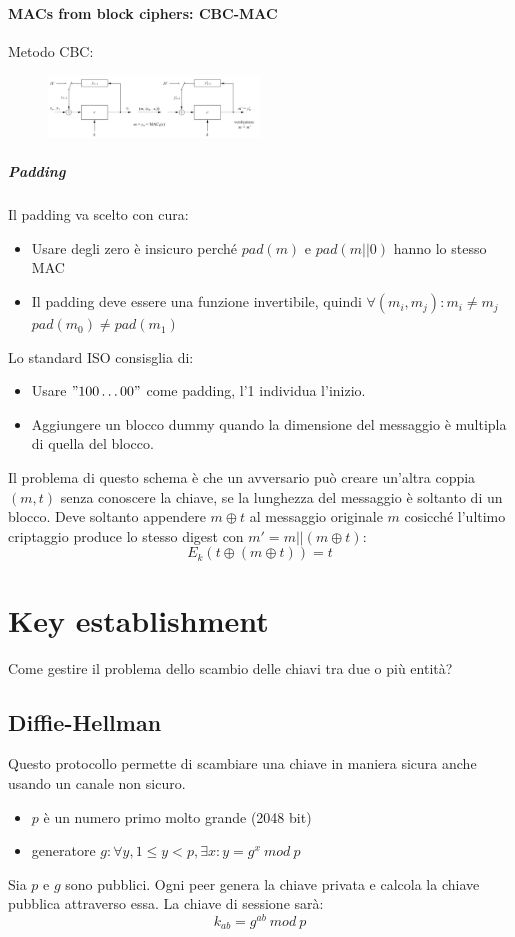 \documentclass[a4paper,12pt]{article}
\begin{document}
\paragraph{MACs from block ciphers: CBC-MAC}
Metodo CBC:
\begin{figure}[H]
  \centering
  \includegraphics[width=0.5\textwidth]{img/cbc-mac}
\end{figure}
\subparagraph{Padding} Il padding va scelto con cura:
\begin{itemize}
	\item Usare degli zero è insicuro perché $pad(m)$ e $pad(m||0)$ hanno lo stesso MAC 
	\item Il padding deve essere una funzione invertibile, quindi $\forall(m_i,m_j) : m_i \neq m_j$ \\ $pad(m_0) \neq pad(m_1)$
\end{itemize}
Lo standard ISO consisglia di:
\begin{itemize}
	\item Usare $"100\ldots00"$ come padding, l'1 individua l'inizio.
	\item Aggiungere un blocco dummy quando la dimensione del messaggio è multipla di quella del blocco.
\end{itemize}
Il problema di questo schema è che un avversario può creare un'altra coppia $(m,t)$ senza conoscere la chiave, se la lunghezza del messaggio è soltanto di un blocco.
Deve soltanto appendere $m \oplus t$ al messaggio originale $m$ cosicché l'ultimo criptaggio produce lo stesso digest con $m' = m||(m \oplus t)$:
$$ E_k(t \oplus (m \oplus t)) = t $$

\newpage

\section{Key establishment}
Come gestire il problema dello scambio delle chiavi tra due o più entità?
\subsection{Diffie-Hellman}
Questo protocollo permette di scambiare una chiave in maniera sicura anche usando un canale non sicuro.
\begin{itemize}
	\item $p$ è un numero primo molto grande (2048 bit)
	\item generatore $g : \forall y, 1 \leq y < p, \exists x : y = g^x\ mod\ p$
\end{itemize}
Sia $p$ e $g$ sono pubblici. Ogni peer genera la chiave privata e calcola la chiave pubblica attraverso essa. La chiave di sessione sarà:
$$ k_{ab} = g^{ab}\ mod\ p $$
\end{document}

